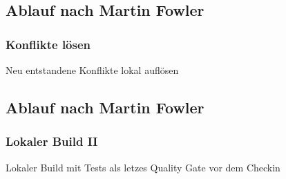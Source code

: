 \documentclass[hyperref={pdfpagelabels=false}]{beamer}
\begin{document}
\subsection{Ablauf nach Martin Fowler}
\begin{frame} [t]
\frametitle{Konflikte lösen}
\begin{figure}[h]
  \centering
\end{figure}
\vspace{0.5cm} 
Neu entstandene Konflikte lokal auflösen
\end{frame}

\subsection{Ablauf nach Martin Fowler}
\begin{frame} [t]
\frametitle{Lokaler Build II}
\begin{figure}[h]
  \centering
\end{figure}
\vspace{0.5cm} 
Lokaler Build mit Tests als letzes Quality Gate vor dem Checkin
\end{frame}
\end{document}
